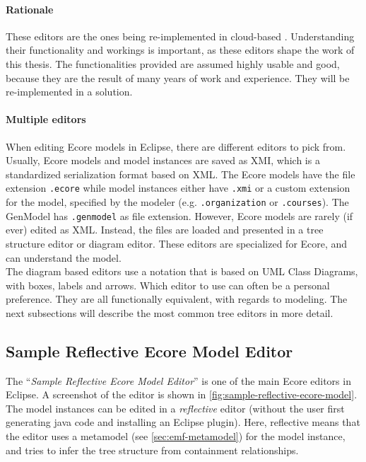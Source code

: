 \paragraph{Rationale}
These editors are the ones being re-implemented in \gls{cloud}-based .
Understanding their functionality and workings is important, as these editors shape the work of this thesis.
The functionalities provided are assumed highly usable and good, because they are the result of many years of work and experience.
They will be re-implemented in a solution.

\paragraph{Multiple editors}
When editing \gls{Ecore} models in \gls{Eclipse}, there are different editors to pick from.
Usually, \gls{Ecore} models and model instances are saved as \acrfull{XMI}, which is a standardized serialization format based on XML.
The \gls{Ecore} models have the file extension \texttt{.ecore} while model instances either have \texttt{.xmi} or a custom extension for the model, specified by the modeler (e.g. \texttt{.organization} or \texttt{.courses}).
The GenModel has \texttt{.genmodel} as file extension.
However, \gls{Ecore} models are rarely (if ever) edited as XML.
Instead, the files are loaded and presented in a tree structure editor or diagram editor.
These editors are specialized for \gls{Ecore}, and can understand the model.\\

The diagram based editors use a notation that is based on \gls{UML} Class Diagrams, with boxes, labels and arrows.
Which editor to use can often be a personal preference.
They are all functionally equivalent, with regards to modeling.
The next subsections will describe the most common tree editors in more detail.

\subsection{Sample Reflective Ecore Model Editor}\label{sec:sample-reflective-editor}

The ``\textit{Sample Reflective Ecore Model Editor}'' is one of the main \gls{Ecore} editors in \gls{Eclipse}.
A screenshot of the editor is shown in \cref{fig:sample-reflective-ecore-model}.
The model instances can be edited in a \textit{reflective} editor (without the user first generating java code and installing an \gls{Eclipse} plugin).
Here, reflective means that the editor uses a metamodel (see \cref{sec:emf-metamodel}) for the model instance, and tries to infer the tree structure from containment relationships.\\


